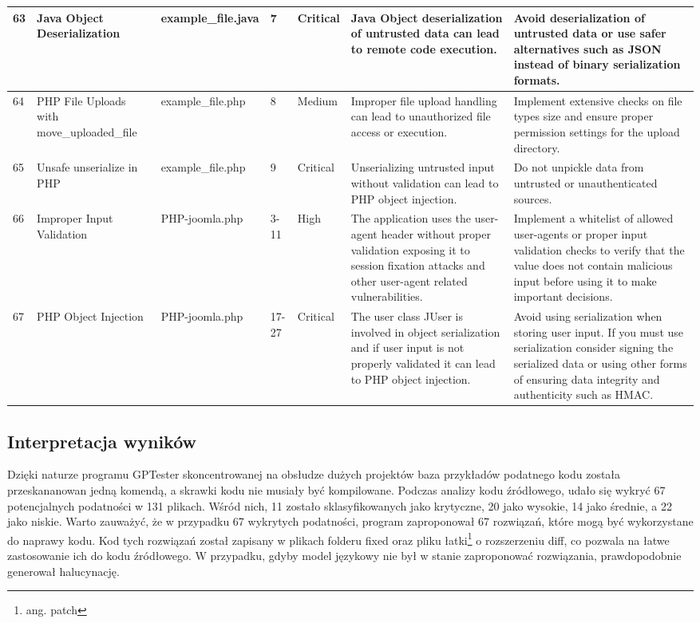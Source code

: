 \begin{landscape}
\begin{table}[H]
{\begin{tabular}{|l|p{4cm}|p{3cm}|p{2cm}|p{1.5cm}|p{12cm}|p{9cm}|}
      63 & Java Object Deserialization & example\_file.java & 7 & Critical & Java Object deserialization of untrusted data can lead to remote code execution. & Avoid deserialization of untrusted data or use safer alternatives such as JSON instead of binary serialization formats. \\ \hline
      64 & PHP File Uploads with move\_uploaded\_file & example\_file.php & 8 & Medium & Improper file upload handling can lead to unauthorized file access or execution. & Implement extensive checks on file types size and ensure proper permission settings for the upload directory. \\ \hline
      65 & Unsafe unserialize in PHP & example\_file.php & 9 & Critical & Unserializing untrusted input without validation can lead to PHP object injection. & Do not unpickle data from untrusted or unauthenticated sources.  \\ \hline
      66 & Improper Input Validation & PHP-joomla.php & 3-11 & High & The application uses the user-agent header without proper validation exposing it to session fixation attacks and other user-agent related vulnerabilities. & Implement a whitelist of allowed user-agents or proper input validation checks to verify that the value does not contain malicious input before using it to make important decisions. \\ \hline
      67 & PHP Object Injection & PHP-joomla.php & 17-27 & Critical & The user class JUser is involved in object serialization and if user input is not properly validated it can lead to PHP object injection. & Avoid using serialization when storing user input. If you must use serialization consider signing the serialized data or using other forms of ensuring data integrity and authenticity such as HMAC. \\ \hline
  \end{tabular}}
  \normalsize
  \label{tab:badania_na_zbiorze_snoopysecurity}
\end{table}
\end{landscape}

\subsection{Interpretacja wyników}
Dzięki naturze programu GPTester skoncentrowanej na obsłudze dużych projektów baza przykładów podatnego kodu została przeskananowan jedną komendą, a skrawki kodu nie musiały być kompilowane.
Podczas analizy kodu źródłowego, udało się wykryć 67 potencjalnych podatności w 131 plikach. Wśród nich, 11 zostało sklasyfikowanych jako krytyczne, 20 jako wysokie, 14 jako średnie, a 22 jako niskie. Warto zauważyć, że w przypadku 67 wykrytych podatności, program zaproponował 67 rozwiązań, które mogą być wykorzystane do naprawy kodu. Kod tych rozwiązań został zapisany w plikach folderu fixed oraz pliku łatki\footnote{ang. patch} o rozszerzeniu diff, co pozwala na łatwe zastosowanie ich do kodu źródłowego. W przypadku, gdyby model językowy nie był w stanie zaproponować rozwiązania, prawdopodobnie generował halucynację.

